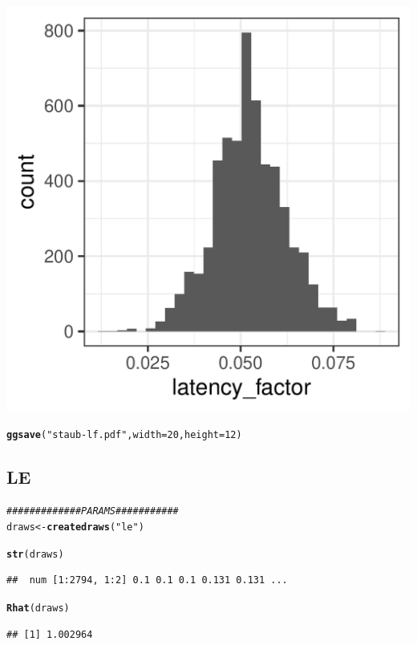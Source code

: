 \documentclass{article}\usepackage[]{graphicx}\usepackage[]{color}
\makeatletter
\def\maxwidth{ %
  \ifdim\Gin@nat@width>\linewidth
    \linewidth
  \else
    \Gin@nat@width
  \fi
}
\newcommand{\hlnum}[1]{\textcolor[rgb]{0.686,0.059,0.569}{#1}}%
\newcommand{\hlstr}[1]{\textcolor[rgb]{0.192,0.494,0.8}{#1}}%
\newcommand{\hlcom}[1]{\textcolor[rgb]{0.678,0.584,0.686}{\textit{#1}}}%
\newcommand{\hlstd}[1]{\textcolor[rgb]{0.345,0.345,0.345}{#1}}%
\newcommand{\hlkwb}[1]{\textcolor[rgb]{0.69,0.353,0.396}{#1}}%
\newcommand{\hlkwc}[1]{\textcolor[rgb]{0.333,0.667,0.333}{#1}}%
\newcommand{\hlkwd}[1]{\textcolor[rgb]{0.737,0.353,0.396}{\textbf{#1}}}%
\newenvironment{kframe}{%
 \def\at@end@of@kframe{}%
 \ifinner\ifhmode%
  \def\at@end@of@kframe{\end{minipage}}%
  \begin{minipage}{\columnwidth}%
 \fi\fi%
 \def\FrameCommand##1{\hskip\@totalleftmargin \hskip-\fboxsep
 \colorbox{shadecolor}{##1}\hskip-\fboxsep
     \hskip-\linewidth \hskip-\@totalleftmargin \hskip\columnwidth}%
 \MakeFramed {\advance\hsize-\width
   \@totalleftmargin\z@ \linewidth\hsize
   \@setminipage}}%
 {\par\unskip\endMakeFramed%
 \at@end@of@kframe}
\newenvironment{knitrout}{}{} %
\makeatother
\begin{document}
\begin{knitrout}
\begin{kframe}
{\ttfamily\noindent\itshape\color{messagecolor}{\#\# `stat\_bin()` using `bins = 30`. Pick better value with `binwidth`.}}\end{kframe}
\includegraphics[width=\maxwidth]{figures/figure_staub_exp3unnamed-chunk-18-1} 
\begin{kframe}\begin{alltt}
\hlkwd{ggsave}\hlstd{(}\hlstr{"staub-lf.pdf"}\hlstd{,} \hlkwc{width} \hlstd{=} \hlnum{20}\hlstd{,} \hlkwc{height} \hlstd{=} \hlnum{12}\hlstd{)}
\end{alltt}


{\ttfamily\noindent\itshape\color{messagecolor}{\#\# `stat\_bin()` using `bins = 30`. Pick better value with `binwidth`.}}\end{kframe}
\end{knitrout}

\subsection{LE}

\begin{knitrout}
\color{fgcolor}\begin{kframe}
\begin{alltt}
\hlcom{############# PARAMS###########}
\hlstd{draws} \hlkwb{<-} \hlkwd{createdraws}\hlstd{(}\hlstr{"le"}\hlstd{)}

\hlkwd{str}\hlstd{(draws)}
\end{alltt}
\begin{verbatim}
##  num [1:2794, 1:2] 0.1 0.1 0.1 0.131 0.131 ...
\end{verbatim}
\begin{alltt}
\hlkwd{Rhat}\hlstd{(draws)}
\end{alltt}
\begin{verbatim}
## [1] 1.002964
\end{verbatim}
\end{kframe}
\end{knitrout}
\end{document}
